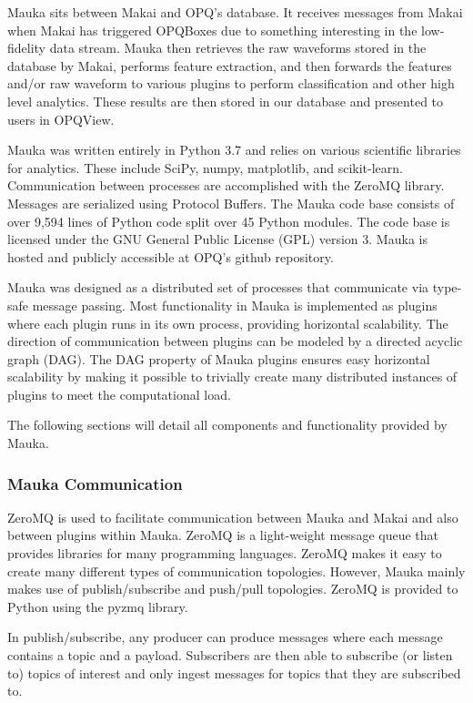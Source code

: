 Mauka sits between Makai and OPQ's database. It receives messages from Makai when Makai has triggered OPQBoxes due to something interesting in the low-fidelity data stream. Mauka then retrieves the raw waveforms stored in the database by Makai, performs feature extraction, and then forwards the features and/or raw waveform to various plugins to perform classification and other high level analytics. These results are then stored in our database and presented to users in OPQView.

Mauka was written entirely in Python 3.7\cite{python:2019} and relies on various scientific libraries for analytics. These include SciPy\cite{scipy:2019}, numpy\cite{numpy}, matplotlib\cite{matplotlib}, and scikit-learn\cite{scikitlearn}. Communication between processes are accomplished with the ZeroMQ\cite{zmq} library. Messages are serialized using Protocol Buffers\cite{protobuf}. The Mauka code base consists of over 9,594 lines of Python code split over 45 Python modules. The code base is licensed under the GNU General Public License (GPL) version 3\cite{gplv3}. Mauka is hosted and publicly accessible at OPQ's github repository\cite{opqgithub}.

Mauka was designed as a distributed set of processes that communicate via type-safe message passing. Most functionality in Mauka is implemented as plugins where each plugin runs in its own process, providing horizontal scalability. The direction of communication between plugins can be modeled by a directed acyclic graph (DAG). The DAG property of Mauka plugins ensures easy horizontal scalability by making it possible to trivially create many distributed instances of plugins to meet the computational load.

The following sections will detail all components and functionality provided by Mauka.

\subsubsection{Mauka Communication}
ZeroMQ is used to facilitate communication between Mauka and Makai and also between plugins within Mauka. ZeroMQ is a light-weight message queue that provides libraries for many programming languages. ZeroMQ makes it easy to create many different types of communication topologies. However, Mauka mainly makes use of publish/subscribe and push/pull topologies. ZeroMQ is provided to Python using the pyzmq library.

In publish/subscribe, any producer can produce messages where each message contains a topic and a payload. Subscribers are then able to subscribe (or listen to) topics of interest and only ingest messages for topics that they are subscribed to.

